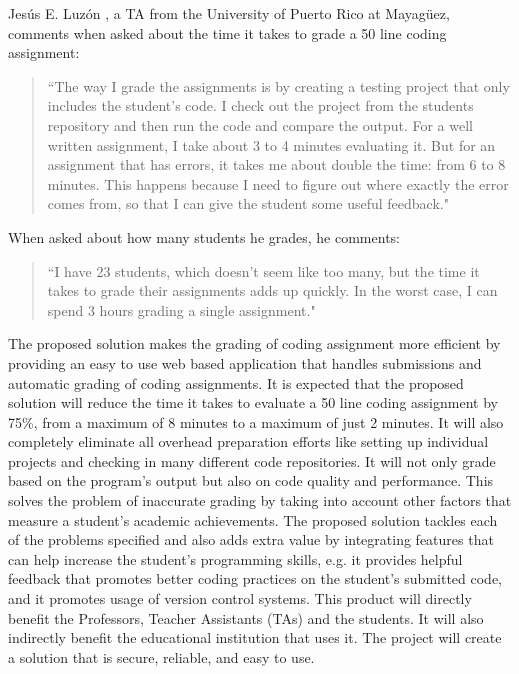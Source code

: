 Jesús E. Luzón \cite{Chiki}, a TA from the University of Puerto Rico at
Mayagüez, comments when asked about the time it takes to grade a 50 line coding
assignment: \begin{quote} ``The way I grade the assignments is by creating a
testing project that only includes the student's code. I check out the project
from the students repository and then run the code and compare the output. For a
well written assignment, I take about 3 to 4 minutes evaluating it. But for an
assignment that has errors, it takes me about double the time: from 6 to 8
minutes. This happens because I need to figure out where exactly the error comes
from, so that I can give the student some useful feedback." \end{quote} When
asked about how many students he grades, he comments: \begin{quote} ``I have 23
students, which doesn't seem like too many, but the time it takes to grade their
assignments adds up quickly. In the worst case, I can spend 3 hours grading a
single assignment." \end{quote}


The proposed solution makes the grading of coding assignment more efficient by
providing an easy to use web based application that handles submissions and
automatic grading of coding assignments. It is expected that the proposed solution will
reduce the time it takes to evaluate a 50 line coding assignment by 75\%, from a
maximum of 8 minutes to a maximum of just 2 minutes. It will also completely
eliminate all overhead preparation efforts like setting up individual projects
and checking in many different code repositories. It will not only grade based on
the program's output but also on code quality and performance. This solves the
problem of inaccurate grading by taking into account other factors that measure
a student's academic achievements. The proposed solution tackles each of the problems
specified and also adds extra value by integrating features that can help
increase the student's programming skills, e.g. it provides helpful feedback
that promotes better coding practices on the student's submitted code, and it
promotes usage of version control systems. This product will directly benefit
the Professors, Teacher Assistants (TAs) and the students. It will also
indirectly benefit the educational institution that uses it. The project will
create a solution that is secure, reliable, and easy to use.
